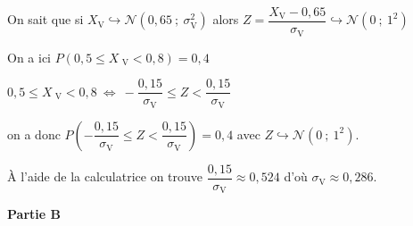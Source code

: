 \documentclass[11pt,a4paper,answers,fancyhdr]{exam}
\newcommand{\equi}{\Longleftrightarrow}
\newcommand{\pp}{\leqslant}
\newcommand{\normale}[2]{\hookrightarrow \mathcal{N}\left(#1~;~#2^2 \right) }
\begin{document}
\begin{enumerate}


\begin{solution}
On sait que si $X_{\text{V}} \normale{0,65}{\sigma_{\text{V}}}$ alors $Z=\dfrac{X_{\text{V}}-0,65}{\sigma_{\text{V}}}\normale{0}{1}$

On a ici $P\left(0,5 \pp X_{\text{ V}}<0,8 \right)= 0,4$

$0,5 \pp X_{\text{ V}}<0,8~ \equi~-\dfrac{0,15}{\sigma_{\text{V}}} \pp Z<\dfrac{0,15}{\sigma_{\text{V}}}$

on a donc $P\left(-\dfrac{0,15}{\sigma_{\text{V}}} \pp Z<\dfrac{0,15}{\sigma_{\text{V}}} \right) =0,4$ avec $Z \normale{0}{1}$.

À l'aide de la calculatrice on trouve $\dfrac{0,15}{\sigma_{\text{V}}}\approx 0,524$ d'où $\sigma_{\text{V}}\approx 0,286$.
\end{solution}
\end{enumerate}

\bigskip
\textbf{Partie B}

\medskip

%
%
%
%
 
\end{document}
